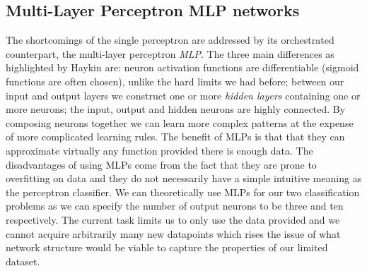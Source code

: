 \documentclass[11pt,a4paper]{article}
\begin{document}
\subsection{Multi-Layer Perceptron MLP networks}
The shortcomings of the single perceptron are addressed by its orchestrated counterpart, the multi-layer perceptron \textit{MLP}. The three main differences as highlighted by Haykin \autocite{Haykin1998} are: neuron activation functions are differentiable (sigmoid functions are often chosen), unlike the hard limits we had before; between our input and output layers we construct one or more \textit{hidden layers} containing one or more neurons; the input, output and hidden neurons are highly connected.
By composing neurons together we can learn more complex patterns at the expense of more complicated learning rules. The benefit of MLPs is that that they can approximate virtually any function provided there is enough data. The disadvantages of using MLPs come from the fact that they are prone to overfitting on data and they do not necessarily have a simple intuitive meaning as the perceptron classifier. We can theoretically use MLPs for our two classification problems as we can specify the number of output neurons to be three and ten respectively. The current task limits us to only use the data provided and we cannot acquire arbitrarily many new datapoints which rises the issue of what network structure would be viable to capture the properties of our limited dataset.

\end{document}
